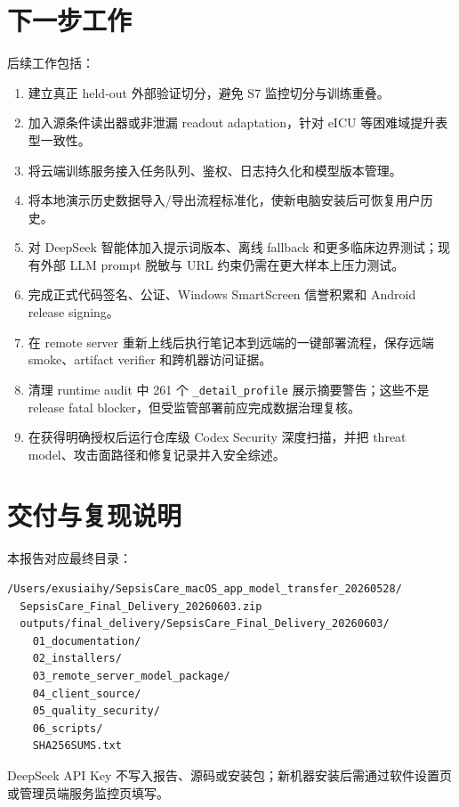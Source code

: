 \documentclass[11pt,a4paper]{article}
\begin{document}
\section{下一步工作}
后续工作包括：
\begin{enumerate}[leftmargin=*,itemsep=1pt]
  \item 建立真正 held-out 外部验证切分，避免 S7 监控切分与训练重叠。
  \item 加入源条件读出器或非泄漏 readout adaptation，针对 eICU 等困难域提升表型一致性。
  \item 将云端训练服务接入任务队列、鉴权、日志持久化和模型版本管理。
  \item 将本地演示历史数据导入/导出流程标准化，使新电脑安装后可恢复用户历史。
  \item 对 DeepSeek 智能体加入提示词版本、离线 fallback 和更多临床边界测试；现有外部 LLM prompt 脱敏与 URL 约束仍需在更大样本上压力测试。
  \item 完成正式代码签名、公证、Windows SmartScreen 信誉积累和 Android release signing。
  \item 在 remote server 重新上线后执行笔记本到远端的一键部署流程，保存远端 smoke、artifact verifier 和跨机器访问证据。
  \item 清理 runtime audit 中 261 个 \texttt{\_detail\_profile} 展示摘要警告；这些不是 release fatal blocker，但受监管部署前应完成数据治理复核。
  \item 在获得明确授权后运行仓库级 Codex Security 深度扫描，并把 threat model、攻击面路径和修复记录并入安全综述。
\end{enumerate}

\section*{交付与复现说明}
本报告对应最终目录：
\begin{lstlisting}
/Users/exusiaihy/SepsisCare_macOS_app_model_transfer_20260528/
  SepsisCare_Final_Delivery_20260603.zip
  outputs/final_delivery/SepsisCare_Final_Delivery_20260603/
    01_documentation/
    02_installers/
    03_remote_server_model_package/
    04_client_source/
    05_quality_security/
    06_scripts/
    SHA256SUMS.txt
\end{lstlisting}
DeepSeek API Key 不写入报告、源码或安装包；新机器安装后需通过软件设置页或管理员端服务监控页填写。
\end{document}
